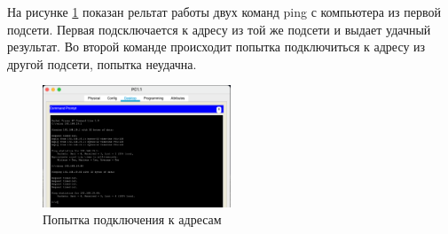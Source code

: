 На рисунке \ref{fig:ping} показан рельтат работы двух команд ping с компьютера из первой подсети. Первая подсключается к адресу из той же подсети и выдает удачный результат. Во второй команде происходит попытка подключиться к адресу из другой подсети, попытка неудачна.

\begin{figure}[H]
    \centering
    \includegraphics[width=0.5\textwidth]{img/content/ping.png}
    \caption{Попытка подключения к адресам}
    \label{fig:ping}
\end{figure}
